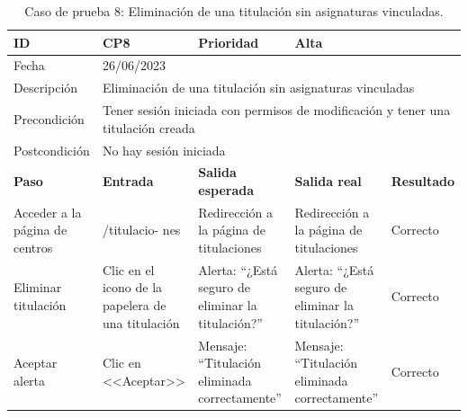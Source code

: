 \begin{table}[H]
\small
\begin{tabular}{p{} p{} p{} p{} p{}}
\cellcolor{gray!25}
ID   & CP8 & \cellcolor{gray!25} Prioridad   & Alta \\ \hline
\cellcolor{gray!25} Fecha	&	\multicolumn{4}{l}{26/06/2023} \\ \hline
\cellcolor{gray!25} Descripción		&	\multicolumn{4}{p{.66\textwidth}}{Eliminación de una titulación sin asignaturas vinculadas} \\ \hline                                            
\cellcolor{gray!25}
Precondición  & \multicolumn{4}{p{.66\textwidth}}{Tener sesión iniciada con permisos de modificación y tener una titulación creada} \\ \hline
\cellcolor{gray!25} Postcondición & \multicolumn{4}{l}{No hay sesión iniciada}                                                    \\ \hline
\rowcolor{gray!25}
\textbf{Paso}   & \textbf{Entrada} & \textbf{Salida esperada} & \textbf{Salida real} & \textbf{Resultado} \\ \hline
Acceder a la página de centros 
& /titulacio-
nes                                                                           
& Redirección a la página de titulaciones                                   
& Redirección a la página de titulaciones                                   
& Correcto                            
\\ \hline
Eliminar titulación
& Clic en el icono de la papelera de una titulación
& Alerta: ``¿Está seguro de eliminar la titulación?''
& Alerta: ``¿Está seguro de eliminar la titulación?''
& Correcto
\\ \hline
Aceptar alerta
& Clic en <<Aceptar>>
& Mensaje: ``Titulación eliminada correctamente''                            
& Mensaje: ``Titulación eliminada correctamente''
& Correcto                            
\\ \hline                
\end{tabular}
\caption{Caso de prueba 8: Eliminación de una titulación sin asignaturas vinculadas.}\label{table:CP8}
\end{table}

